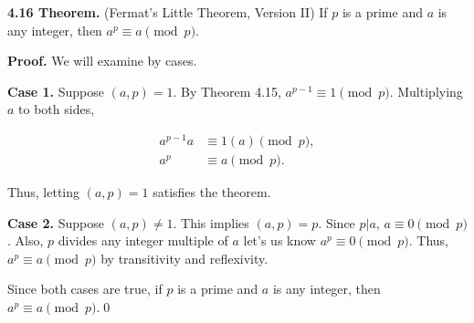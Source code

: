 \documentclass[12pt]{article}
\begin{document}
\noindent\textbf{4.16 Theorem.} (Fermat's Little Theorem, Version II) If $p$ is a prime and $a$ is any integer, then $a^{p}\equiv a\pmod p$.

\bigskip

\noindent\textbf{Proof.} We will examine by cases.

\bigskip

\noindent\textbf{Case 1.} Suppose $(a,p)=1$. By Theorem 4.15, $a^{p-1}\equiv 1\pmod p$. Multiplying $a$ to both sides,

\begin{align*}
a^{p-1}a &\equiv 1(a)\pmod p,\\
a^p &\equiv a\pmod p.
\end{align*}

\noindent Thus, letting $(a,p)=1$ satisfies the theorem.

\bigskip

\noindent\textbf{Case 2.} Suppose $(a,p)\not= 1$. This implies $(a,p)=p$. Since $p|a$, $a\equiv 0\pmod p$. Also, $p$ divides any integer multiple of $a$ let's us know $a^p\equiv 0\pmod p$. Thus, $a^p\equiv a\pmod p$ by transitivity and reflexivity.

\bigskip

\noindent Since both cases are true, if $p$ is a prime and $a$ is any integer, then $a^{p}\equiv a\pmod p$.\qed
\end{document}
